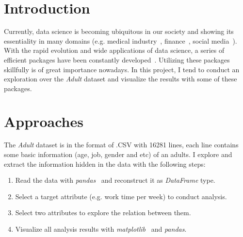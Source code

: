 \documentclass[12pt,a4paper]{article}
\theoremstyle{definition}
\begin{document}
\noindent
\noindent{}
\vspace{-1.5\baselineskip}
\section{Introduction} %

Currently, data science is becoming ubiquitous in our society and showing its essentiality in many domains (e.g. medical industry~\cite{medical1, medical2}, finance~\cite{finance}, social media~\cite{media1, media2}). With the rapid evolution and wide applications of data science, a series of efficient packages have been constantly developed~\cite{numpy, pandas, matplotlib, sklearn}. Utilizing these packages skillfully is of great importance nowadays. In this project, I tend to conduct an exploration over the \textit{Adult} dataset and visualize the results with some of these packages.

\vspace{-1\baselineskip}
\section{Approaches}

The \textit{Adult} dataset is in the format of .CSV with 16281 lines, each line contains some basic information (age, job, gender and etc) of an adults. I explore and extract the information hidden in the data with the following steps:
\begin{enumerate}
\item Read the data with \textit{pandas}~\cite{pandas} and reconstruct it as \textit{DataFrame} type.

\item Select a target attribute (e.g. work time per week) to conduct analysis.

\item Select two attributes to explore the relation between them.

\item Visualize all analysis results with \textit{matplotlib}~\cite{matplotlib} and \textit{pandas}.
\end{enumerate}
\end{document}
